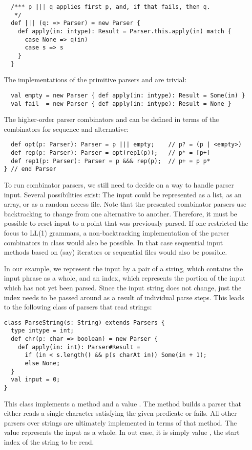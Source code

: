 {\begin{lstlisting}
  /*** p ||| q applies first p, and, if that fails, then q.
   */
  def ||| (q: => Parser) = new Parser {
    def apply(in: intype): Result = Parser.this.apply(in) match {
      case None => q(in)
      case s => s
    }
  }
\end{lstlisting}
The implementations of the primitive parsers  and 
are trivial:
\begin{lstlisting}
  val empty = new Parser { def apply(in: intype): Result = Some(in) }
  val fail  = new Parser { def apply(in: intype): Result = None }
\end{lstlisting}
The higher-order parser combinators  and  can be
defined in terms of the combinators for sequence and alternative:
\begin{lstlisting}
  def opt(p: Parser): Parser = p ||| empty;    // p? = (p | <empty>)
  def rep(p: Parser): Parser = opt(rep1(p));   // p* = [p+]
  def rep1(p: Parser): Parser = p &&& rep(p);  // p+ = p p*
} // end Parser
\end{lstlisting}
To run combinator parsers, we still need to decide on a way to handle
parser input. Several possibilities exist: The input could be
represented as a list, as an array, or as a random access file.  Note
that the presented combinator parsers use backtracking to change from
one alternative to another.  Therefore, it must be possible to reset
input to a point that was previously parsed. If one restricted the
focus to LL(1) grammars, a non-backtracking implementation of the
parser combinators in class  would also be possible. In
that case sequential input methods based on (say) iterators or
sequential files would also be possible.

In our example, we represent the input by a pair of a string, which
contains the input phrase as a whole, and an index, which represents
the portion of the input which has not yet been parsed. Since the
input string does not change, just the index needs to be passed around
as a result of individual parse steps.  This leads to the following
class of parsers that read strings:
\begin{lstlisting}
class ParseString(s: String) extends Parsers {
  type intype = int;
  def chr(p: char => boolean) = new Parser {
    def apply(in: int): Parser#Result = 
      if (in < s.length() && p(s charAt in)) Some(in + 1);
      else None;
  }
  val input = 0;
}
\end{lstlisting}
This class implements a method  and a
value . The  method builds a parser that either
reads a single character satisfying the given predicate  or
fails.  All other parsers over strings are ultimately implemented in
terms of that method. The  value represents the input as a
whole. In out case, it is simply value , the start index of
the string to be read.

}
